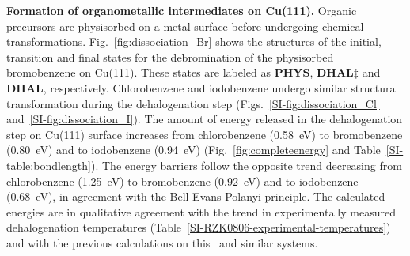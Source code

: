 \documentclass[journal=jacsat,manuscript=article]{achemso}
\newcommand{\lock}{\color{red}}
\newcommand{\lock}{\color{black}}
\newcommand{\comm}{\color{ForestGreen}} %
\newcommand{\sinfo}{Supplementary Information}
\begin{document}
{\lock

\textbf{Formation of organometallic intermediates on Cu(111).} Organic precursors are physisorbed on a metal surface before undergoing chemical transformations. 
%
Fig.~\ref{fig:dissociation_Br} shows the structures of the initial, transition and final states for the debromination of the physisorbed bromobenzene on Cu(111). These states are labeled as \textbf{PHYS}, \textbf{DHAL$\ddagger$} and \textbf{DHAL}, respectively. Chlorobenzene and iodobenzene undergo similar structural transformation during the dehalogenation step (Figs.~\ref{SI-fig:dissociation_Cl} and~\ref{SI-fig:dissociation_I}).
%
%
The amount of energy released in the dehalogenation step on Cu(111) surface increases from chlorobenzene (\SI{0.58}{\electronvolt}) to bromobenzene (\SI{0.80}{\electronvolt}) and to iodobenzene (\SI{0.94}{\electronvolt}) (Fig.~\ref{fig:completeenergy} and Table~\ref{SI-table:bondlength}).
The energy barriers follow the opposite trend decreasing from chlorobenzene (\SI{1.25}{\electronvolt}) to bromobenzene (\SI{0.92}{\electronvolt}) and to iodobenzene (\SI{0.68}{\electronvolt}), in agreement with the Bell-Evans-Polanyi principle.
The calculated energies are in qualitative agreement with the trend in experimentally measured dehalogenation temperatures (Table~\ref{SI-RZK0806-experimental-temperatures})~\cite{ullmann_52,ullmann_87,ullmann_67} and with the previous calculations on this~\cite{jacs2013} and similar systems.

}
\end{document}
